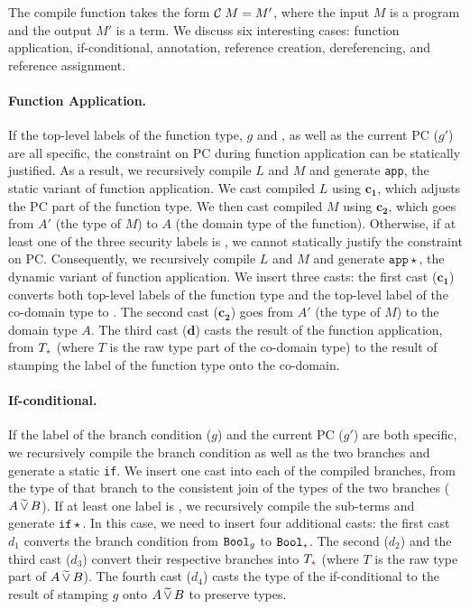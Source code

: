 
The compile function takes the form $\mathcal{C}\;{M} = M'$, where the input $M$ is a
\Surface program and the output $M'$ is a \CC term. We discuss six interesting
cases: function application, if-conditional, annotation, reference creation,
dereferencing, and reference assignment.

\paragraph{Function Application.}
If the top-level labels of the function type, $g$ and \gc, as well as the
current PC ($g'$) are all specific, the constraint on PC during function
application can be statically justified. As a result, we recursively compile $L$
and $M$ and generate \texttt{app}, the static variant of function application.
We cast compiled $L$ using $\bm{c_1}$, which adjusts the PC part of the function
type. We then cast compiled $M$ using $\bm{c_2}$, which goes from $A'$ (the type
of $M$) to $A$ (the domain type of the function). Otherwise, if at least one of
the three security labels is \unk, we cannot statically justify the constraint
on PC. Consequently, we recursively compile $L$ and $M$ and generate
$\mathtt{app}{\star}$, the dynamic variant of function application. We insert
three casts: the first cast ($\bm{c_1}$) converts both top-level labels of the
function type and the top-level label of the co-domain type to \unk. The second
cast ($\bm{c_2}$) goes from $A'$ (the type of $M$) to the domain type $A$. The
third cast ($\bm{d}$) casts the result of the function application, from
$T_{\unk}$ (where $T$ is the raw type part of the co-domain type) to the result
of stamping the label of the function type onto the co-domain.

\paragraph{If-conditional.}
If the label of the branch condition ($g$) and the current PC ($g'$) are both
specific, we recursively compile the branch condition as well as the two
branches and generate a static \texttt{if}. We insert one cast into each of the
compiled branches, from the type of that branch to the consistent join of the
types of the two branches ($A \,\widetilde{\vee}\, B$). If at least one label is \unk, we
recursively compile the sub-terms and generate $\mathtt{if}{\star}$. In this
case, we need to insert four additional casts: the first cast $d_1$ converts the
branch condition from $\mathtt{Bool}_g$ to $\Bool_{\unk}$. The second ($d_2$) and the
third cast ($d_3$) convert their respective branches into $T_{\unk}$ (where $T$
is the raw type part of $A \,\widetilde{\vee}\, B$). The fourth cast ($d_4$) casts the
type of the if-conditional to the result of stamping $g$ onto $A \,\widetilde{\vee}\, B$
to preserve types.


